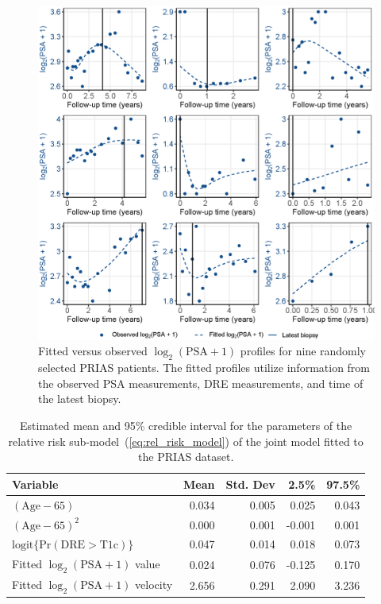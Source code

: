 \begin{figure}[!htb]
\centerline{\includegraphics[width=\columnwidth]{images/fitted_9subject_psa.eps}}
\caption{Fitted versus observed ${\log_2 (\mbox{PSA} + 1)}$ profiles for nine randomly selected PRIAS patients. The fitted profiles utilize information from the observed PSA measurements, DRE measurements, and time of the latest biopsy.}
\label{fig:fitted_9subject_psa}
\end{figure}

\begin{table}[!htb]
\begin{center}
\caption{Estimated mean and 95\% credible interval for the parameters of the relative risk sub-model~(\ref{eq:rel_risk_model}) of the joint model fitted to the PRIAS dataset.}
\label{tab:DRE_PSA_survival}
\begin{tabular}{lrrrr}
\hline
\hline
Variable                      & Mean   & Std. Dev & 2.5\%  & 97.5\% \\
\hline
$(\mbox{Age} - 65)$  & 0.034 & 0.005 & 0.025 & 0.043 \\
$(\mbox{Age} - 65)^2$ & 0.000 & 0.001 & -0.001 & 0.001 \\
$\mbox{logit} \big\{\mbox{Pr}(\mbox{DRE} > \mbox{T1c})\big\}$ & 0.047 & 0.014 & 0.018 & 0.073 \\
Fitted $\log_2 (\mbox{PSA} + 1)$ value  & 0.024 & 0.076 & -0.125 & 0.170\\
Fitted $\log_2 (\mbox{PSA} + 1)$ velocity  & 2.656 & 0.291 & 2.090 & 3.236 \\
\hline
\end{tabular}
\end{center}
\end{table}

